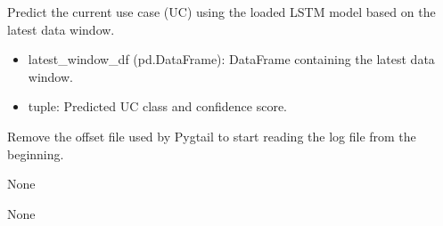 \documentclass[letterpaper,10pt,english]{sphinxmanual}
\begin{document}

\begin{fulllineitems}
\label{\detokenize{network_watcher:network_watcher.predict_current_uc}}
\pysigstartsignatures
{}
\pysigstopsignatures
\sphinxAtStartPar
Predict the current use case (UC) using the loaded LSTM model based on the latest data window.
\begin{description}
\begin{itemize}
\item {} 
\sphinxAtStartPar
latest\_window\_df (pd.DataFrame): DataFrame containing the latest data window.

\end{itemize}

\begin{itemize}
\item {} 
\sphinxAtStartPar
tuple: Predicted UC class and confidence score.

\end{itemize}

\end{description}

\end{fulllineitems}


\begin{fulllineitems}
\label{\detokenize{network_watcher:network_watcher.remove_offset}}
\pysigstartsignatures
{}
\pysigstopsignatures
\sphinxAtStartPar
Remove the offset file used by Pygtail to start reading the log file from the beginning.
\begin{description}
\sphinxAtStartPar
None

\sphinxAtStartPar
None

\end{description}

\end{fulllineitems}
\end{document}
